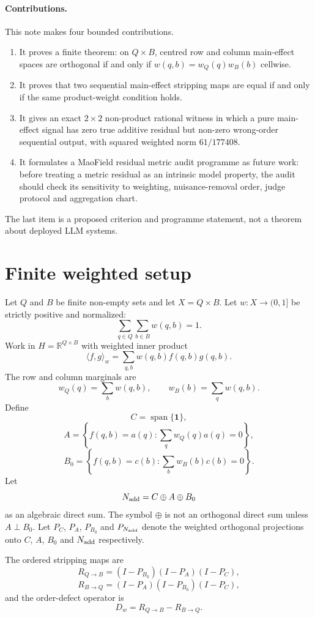 \documentclass[11pt]{article}
\theoremstyle{remark}
\newcommand{\R}{\mathbb{R}}
\newcommand{\one}{\mathbf{1}}
\newcommand{\ip}[2]{\langle #1,#2\rangle_w}
\newcommand{\RQBt}{R_{Q\to B}}
\newcommand{\RBQt}{R_{B\to Q}}
\begin{document}
\paragraph{Contributions.}
This note makes four bounded contributions.
\begin{enumerate}[leftmargin=*,itemsep=2pt]
\item It proves a finite theorem: on $Q\times B$, centred row and column main-effect spaces are orthogonal if and only if $w(q,b)=w_Q(q)w_B(b)$ cellwise.
\item It proves that two sequential main-effect stripping maps are equal if and only if the same product-weight condition holds.
\item It gives an exact $2\times2$ non-product rational witness in which a pure main-effect signal has zero true additive residual but non-zero wrong-order sequential output, with squared weighted norm $61/177408$.
\item It formulates a MaoField residual metric audit programme as future work: before treating a metric residual as an intrinsic model property, the audit should check its sensitivity to weighting, nuisance-removal order, judge protocol and aggregation chart.
\end{enumerate}
The last item is a proposed criterion and programme statement, not a theorem about deployed LLM systems.

\section{Finite weighted setup}

Let $Q$ and $B$ be finite non-empty sets and let $X=Q\times B$. Let $w:X\to(0,1]$ be strictly positive and normalized:
\[
\sum_{q\in Q}\sum_{b\in B} w(q,b)=1.
\]
Work in $H=\R^{Q\times B}$ with weighted inner product
\[
\ip{f}{g}=\sum_{q,b} w(q,b)f(q,b)g(q,b).
\]
The row and column marginals are
\[
w_Q(q)=\sum_b w(q,b),\qquad w_B(b)=\sum_q w(q,b).
\]
Define
\[
C=\operatorname{span}\{\one\},
\]
\[
A=\left\{f(q,b)=a(q):\sum_q w_Q(q)a(q)=0\right\},
\]
\[
B_0=\left\{f(q,b)=c(b):\sum_b w_B(b)c(b)=0\right\}.
\]
Let
\[
N_{\rm add}=C\oplus A\oplus B_0
\]
as an algebraic direct sum. The symbol $\oplus$ is not an orthogonal direct sum unless $A\perp B_0$. Let $P_C$, $P_A$, $P_{B_0}$ and $P_{N_{\rm add}}$ denote the weighted orthogonal projections onto $C$, $A$, $B_0$ and $N_{\rm add}$ respectively.

The ordered stripping maps are
\[
\RQBt=(I-P_{B_0})(I-P_A)(I-P_C),
\]
\[
\RBQt=(I-P_A)(I-P_{B_0})(I-P_C),
\]
and the order-defect operator is
\[
D_w=\RQBt-\RBQt.
\]
\end{document}
